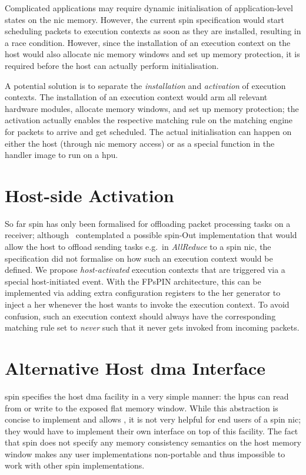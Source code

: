 Complicated applications may require dynamic initialisation of application-level states on the \ac{nic} memory.  However, the current \ac{spin} specification would start scheduling packets to execution contexts as soon as they are installed, resulting in a race condition.  However, since the installation of an execution context on the host would also allocate \ac{nic} memory windows and set up memory protection, it is required before the host can actually perform initialisation.

A potential solution is to separate the \emph{installation} and \emph{activation} of execution contexts.  The installation of an execution context would arm all relevant hardware modules, allocate memory windows, and set up memory protection; the activation actually enables the respective matching rule on the matching engine for packets to arrive and get scheduled.  The actual initialisation can happen on either the host (through \ac{nic} memory access) or as a special function in the handler image to run on a \ac{hpu}.

\section{Host-side Activation}

So far \ac{spin} has only been formalised for offloading packet processing tasks on a receiver; although~\cite{di_girolamo_network-accelerated_2019} contemplated a possible \ac{spin}-Out implementation that would allow the host to offload sending tasks e.g.\ in \emph{AllReduce} to a \ac{spin} \ac{nic}, the specification did not formalise on how such an execution context would be defined.  We propose \emph{host-activated} execution contexts that are triggered via a special host-initiated event.  With the FPsPIN architecture, this can be implemented via adding extra configuration registers to the \ac{her} generator to inject a \ac{her} whenever the host wants to invoke the execution context.  To avoid confusion, such an execution context should always have the corresponding matching rule set to \emph{never} such that it never gets invoked from incoming packets.

\section{Alternative Host \ac{dma} Interface} \label{sec:streaming-host-dma}

\ac{spin} specifies the host \ac{dma} facility in a very simple manner: the \ac{hpu}s can read from or write to the exposed flat memory window.  While this abstraction is concise to implement and allows , it is not very helpful for end users of a \ac{spin} \ac{nic}; they would have to implement their own interface on top of this facility.  The fact that \ac{spin} does not specify any memory consistency semantics on the host memory window makes any user implementations non-portable and thus impossible to work with other \ac{spin} implementations.

